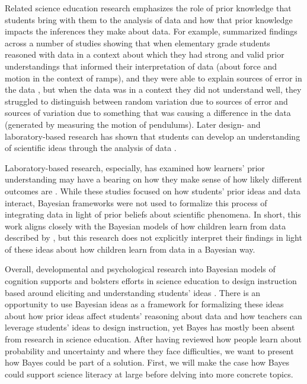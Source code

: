\documentclass[man]{apa7}
\begin{document}
Related science education research emphasizes the role of prior knowledge that students bring with them to the analysis of data and how that prior knowledge impacts the inferences they make about data. For example, \textcite{mkm07} summarized findings across a number of studies showing that when elementary grade students reasoned with data in a context about which they had strong and valid prior understandings that informed their interpretation of data (about force and motion in the context of ramps), and they were able to explain sources of error in the data \parencite{mk03}, but when the data was in a context they did not understand well, they struggled to distinguish between random variation due to sources of error and sources of variation due to something that was causing a difference in the data (generated by measuring the motion of pendulums). Later design- and laboratory-based research has shown that students can develop an understanding of scientific ideas through the analysis of data \parencite{ls04,mkk17}.

Laboratory-based research, especially, has examined how learners’ prior understanding may have a bearing on how they make sense of how likely different outcomes are \parencite{kd88, mkm07, ssc07}. While these studies focused on how students’ prior ideas and data interact, Bayesian frameworks were not used to formalize this process of integrating data in light of prior beliefs about scientific phenomena. In short, this work aligns closely with the Bayesian models of how children learn from data described by \textcite{g12}, but this research does not explicitly interpret their findings in light of these ideas about how children learn from data in a Bayesian way.

Overall, developmental and psychological research into Bayesian models of cognition supports and bolsters efforts in science education to design instruction based around eliciting and understanding students’ ideas \parencite{gb16, hbavb20, wtbs12}. There is an opportunity to use Bayesian ideas as a framework for formalizing these ideas about how prior ideas affect students’ reasoning about data and how teachers can leverage students’ ideas to design instruction, yet Bayes has mostly been absent from research in science education.
After having reviewed how people learn about probability and uncertainty and where they face difficulties, we want to present how Bayes could be part of a solution. First, we will make the case how Bayes could support science literacy at large before delving into more concrete topics.
\end{document}

